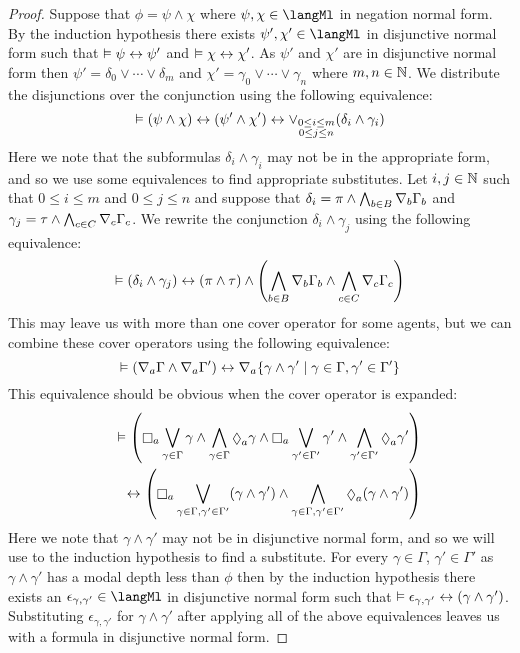 \begin{proof}
Suppose that $\phi = \psi \land \chi$ where $\psi, \chi \in \langMl$ in negation normal form.
By the induction hypothesis there exists $\psi', \chi' \in \langMl$ in disjunctive normal form such that $\vDash \psi \leftrightarrow \psi'$ and $\vDash \chi \leftrightarrow \chi'$.
As $\psi'$ and $\chi'$ are in disjunctive normal form then $\psi' = \delta_0 \lor \cdots \lor \delta_m$ and $\chi' = \gamma_0 \lor \cdots \lor \gamma_n$ where $m, n \in \mathbb{N}$.
We distribute the disjunctions over the conjunction using the following equivalence:
$$
\vDash (\psi \land \chi) \leftrightarrow (\psi' \land \chi') \leftrightarrow \vee_{\substack{0 \leq i \leq m\\0 \leq j \leq n}} (\delta_i \land \gamma_i)
$$
Here we note that the subformulas $\delta_i \land \gamma_i$ may not be in the appropriate form, and so we use some equivalences to find appropriate substitutes. 
Let $i, j \in \mathbb{N}$ such that $0 \leq i \leq m$ and $0 \leq j \leq n$ and suppose that $\delta_i = \pi \land \bigwedge_{b \in B} \nabla_{b} \Gamma_b$ and $\gamma_j = \tau \land \bigwedge_{c \in C} \nabla_{c} \Gamma_c$.
We rewrite the conjunction $\delta_i \land \gamma_j$ using the following equivalence:
$$
\vDash (\delta_i \land \gamma_j) \leftrightarrow 
(\pi \land \tau) \land \left( \bigwedge_{b \in B} \nabla_{b} \Gamma_b \land \bigwedge_{c \in C} \nabla_{c} \Gamma_c \right)
$$
This may leave us with more than one cover operator for some agents, but we can combine these cover operators using the following equivalence:
$$
\vDash (\nabla_{a} \Gamma \land \nabla_{a} \Gamma') \leftrightarrow \nabla_{a} \{\gamma \land \gamma' \mid \gamma \in \Gamma, \gamma' \in \Gamma'\}
$$
This equivalence should be obvious when the cover operator is expanded:
\begin{eqnarray*}
&&\entails \left( \necessaryA \bigvee_{\gamma \in \Gamma} \gamma \land \bigwedge_{\gamma \in \Gamma} \possibleA \gamma \land \necessaryA \bigvee_{\gamma' \in \Gamma'} \gamma' \land \bigwedge_{\gamma' \in \Gamma'} \possibleA \gamma' \right)
\\&&\quad\iff
\left( \necessaryA \bigvee_{\gamma \in \Gamma, \gamma' \in \Gamma'} (\gamma \land \gamma') \land \bigwedge_{\gamma \in \Gamma, \gamma' \in \Gamma'} \possibleA (\gamma \land \gamma') \right)
\end{eqnarray*}
Here we note that $\gamma \land \gamma'$ may not be in disjunctive normal form, and so we will use to the induction hypothesis to find a substitute.
For every $\gamma \in \Gamma$, $\gamma' \in \Gamma'$ as $\gamma \land \gamma'$ has a modal depth less than $\phi$ then by the induction hypothesis there exists an $\epsilon_{\gamma,\gamma'} \in \langMl$ in disjunctive normal form such that $\vDash \epsilon_{\gamma,\gamma'} \leftrightarrow (\gamma \land \gamma')$.
Substituting $\epsilon_{\gamma,\gamma'}$ for $\gamma \land \gamma'$ after applying all of the above equivalences leaves us with a formula in disjunctive normal form.
\end{proof}

